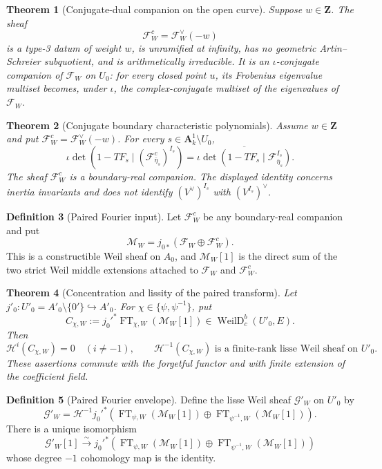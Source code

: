 \documentclass[10pt]{article}
\newtheorem{theorem}{Theorem}[section]
\theoremstyle{definition}
\newtheorem{definition}[theorem]{Definition}
\newcommand{\FT}{\operatorname{FT}}
\begin{document}
\begin{theorem}[Conjugate-dual companion on the open curve]
Suppose \(w\in\mathbf Z\).  The sheaf
\[
 \mathcal F_W^c=\mathcal F_W^\vee(-w)
\]
is a type-3 datum of weight \(w\), is unramified at infinity, has no
geometric Artin--Schreier subquotient, and is arithmetically irreducible.  It
is an \(\iota\)-conjugate companion of \(\mathcal F_W\) on \(U_0\): for every
closed point \(u\), its Frobenius eigenvalue multiset becomes, under
\(\iota\), the complex-conjugate multiset of the eigenvalues of
\(\mathcal F_W\).
\end{theorem}

\begin{theorem}[Conjugate boundary characteristic polynomials]
Assume \(w\in\mathbf Z\) and put
\(\mathcal F_W^c=\mathcal F_W^\vee(-w)\).  For every
\(s\in\mathbf A^1_k\setminus U_0\),
\[
 \iota\det\!\left(1-TF_s\mid
    (\mathcal F^c_{\bar\eta_s})^{I_s}\right)
 =\overline{
 \iota\det\!\left(1-TF_s\mid
    \mathcal F_{\bar\eta_s}^{I_s}\right)}.
\]
The sheaf \(\mathcal F_W^c\) is a boundary-real companion.  The displayed
identity concerns inertia invariants and does not identify
\((V^\vee)^{I_s}\) with \((V^{I_s})^\vee\).
\end{theorem}

\begin{definition}[Paired Fourier input]
Let \(\mathcal F_W^c\) be any boundary-real companion and put
\[
 \mathcal M_W=j_{0*}(\mathcal F_W\oplus\mathcal F_W^c).
\]
This is a constructible Weil sheaf on \(A_0\), and
\(\mathcal M_W[1]\) is the direct sum of the two strict Weil middle
extensions attached to \(\mathcal F_W\) and \(\mathcal F_W^c\).
\end{definition}

\begin{theorem}[Concentration and lissity of the paired transform]
Let \(j'_0:U'_0=A'_0\setminus\{0'\}\hookrightarrow A'_0\).  For
\(\chi\in\{\psi,\psi^{-1}\}\), put
\[
 C_{\chi,W}:=j_0'^*\FT_{\chi,W}(\mathcal M_W[1])
       \in\operatorname{WeilD}^b_c(U'_0,E).
\]
Then
\[
 \mathcal H^i(C_{\chi,W})=0\quad(i\ne-1),
 \qquad
 \mathcal H^{-1}(C_{\chi,W})
 \text{ is a finite-rank lisse Weil sheaf on }U'_0.
\]
These assertions commute with the forgetful functor and with finite
extension of the coefficient field.
\end{theorem}

\begin{definition}[Paired Fourier envelope]
Define the lisse Weil sheaf \(\mathcal G'_W\) on \(U'_0\) by
\[
 \mathcal G'_W=
 \mathcal H^{-1}j_0'^*\!\left(
  \FT_{\psi,W}(\mathcal M_W[1])\oplus
  \FT_{\psi^{-1},W}(\mathcal M_W[1])
 \right).
\]
There is a unique isomorphism
\[
 \mathcal G'_W[1]\xrightarrow{\sim}j_0'^*\!\left(
  \FT_{\psi,W}(\mathcal M_W[1])\oplus
  \FT_{\psi^{-1},W}(\mathcal M_W[1])
 \right)
\]
whose degree \(-1\) cohomology map is the identity.
\end{definition}
\end{document}
